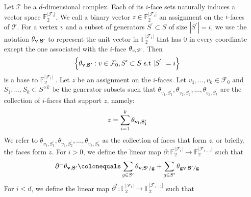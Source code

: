 \begin{definition}
  Let $\mathcal{T}$ be a $d$-dimensional complex. Each of its $i$-face sets naturally induces a vector space $\mathbb{F}_{2}^{|\mathcal{F}_{i}|}$. We call a binary vector $z \in \mathbb{F}_{2}^{|\mathcal{F}_{i}|}$ an assignment on the $i$-faces of $\mathcal{T}$. For a vertex $v$ and a subset of generators $S^{\prime} \subset S$ of size $|S^{\prime}|=i$, we use the notation $\mathbf{\theta_{v ,S^{\prime}}{} }{}$ to represent the unit vector in $\mathbb{F}_{2}^{|\mathcal{F}_{i}|}$ that has $0$ in every coordinate except the one associated with the $i$-face $\theta_{v ,S^{\prime}}{}$. Then
  \begin{equation*}
    \begin{split}
      \left\{ \mathbf{\theta_{v ,S^{\prime}}{} }{} : v \in \mathcal{F}_{0}, S^{\prime} \subset S \text{ s.t } |S^{^\prime}| = i  \right\}
    \end{split}
  \end{equation*} is a base to $\mathbb{F}_{2}^{|\mathcal{F}_{i}|}$ .
Let $z$ be an assignment on the $i$-faces. Let $v_{1}, \ldots, v_{k} \in \mathcal{F}_{0}$ and $S_{1}, \ldots, S_{k} \subset S^{\times k}$ be the generator subsets such that $\theta_{v_{1},S^{\prime}_{1}}, \theta_{v_{2},S^{\prime}_{2}}, \ldots, \theta_{v_{k},S^{\prime}_{k}}$ are the collection of $i$-faces that support $z$, namely:
  \begin{equation*}
    \begin{split}
    z = \sum_{i=1}^{k}\mathbf{\theta_{v_{i} ,S^{\prime}_{i}} }
    \end{split}
  \end{equation*} 
  We refer to $\theta_{v_{1},S^{\prime}_{1}}, \theta_{v_{2},S^{\prime}_{2}}, \ldots, \theta_{v_{k},S^{\prime}_{k}}$ as the collection of faces that form $z$, or briefly, the faces form $z$.
  For $i > 0$, we define the linear map $\partial: \mathbb{F}_{2}^{|\mathcal{F}_{i}|} \rightarrow \mathbb{F}_{2}^{|\mathcal{F}_{i-1}|}$ such that
  \begin{equation*}
    \begin{split}
      \partial^{-} \rotfvs{} \colonequals \sum_{g \in S^{\prime}} \rotfv{v}{S^{\prime}/g} + \sum_{g \in S^{\prime}} \rotfv{gv}{S^{\prime}/g} 
    \end{split}
  \end{equation*}
  For $i < d$, we define the linear map $\partial^{*}: \mathbb{F}_{2}^{|\mathcal{F}_{i}|} \rightarrow \mathbb{F}_{2}^{|\mathcal{F}_{i+1}|}$ such that
  \begin{equation*}

\end{equation*}
\end{definition}
